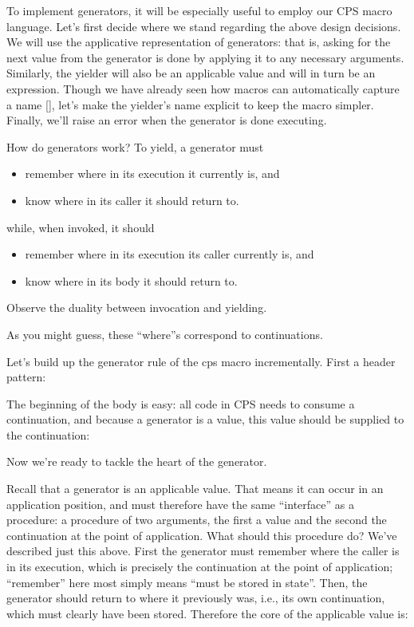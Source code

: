 
To implement generators, it will be especially useful to employ our CPS macro
language. Let’s first decide where we stand regarding the above design
decisions. We will use the applicative representation of generators: that is,
asking for the next value from the generator is done by applying it to any
necessary arguments. Similarly, the yielder will also be an applicable value and
will in turn be an expression. Though we have already seen how macros can
automatically capture a name \ref{}, let’s make the yielder’s name explicit to
keep the macro simpler. Finally, we’ll raise an error when the generator is done
executing.

How do generators work? To yield, a generator must
\begin{itemize}[nosep]
\item remember where in its execution it currently is, and
\item know where in its caller it should return to.
\end{itemize}
while, when invoked, it should
\begin{itemize}[nosep]
  \item 
remember where in its execution its caller currently is, and
  \item 
know where in its body it should return to.
\end{itemize}
Observe the duality between invocation and yielding.

As you might guess, these “where”s correspond to continuations.

Let’s build up the generator rule of the cps macro incrementally. First a header
pattern:

The beginning of the body is easy: all code in CPS needs to consume a
continuation, and because a generator is a value, this value should be supplied
to the continuation:

Now we’re ready to tackle the heart of the generator.

Recall that a generator is an applicable value. That means it can occur in an
application position, and must therefore have the same “interface” as a
procedure: a procedure of two arguments, the first a value and the second the
continuation at the point of application. What should this procedure do? We’ve
described just this above. First the generator must remember where the caller is
in its execution, which is precisely the continuation at the point of
application; “remember” here most simply means “must be stored in state”. Then,
the generator should return to where it previously was, i.e., its own
continuation, which must clearly have been stored. Therefore the core of the
applicable value is:

